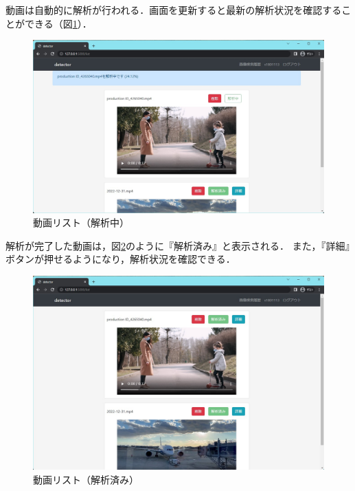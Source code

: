 \documentclass[a4j,12pt,dvipdfmx]{jreport}
\begin{document}
動画は自動的に解析が行われる．画面を更新すると最新の解析状況を確認することができる（図\ref{fig:ongoing}）．
\begin{figure}[H]
  \centering
  \includegraphics[width=13cm]{image/ongoing.jpg}
  \caption{動画リスト（解析中）}
  \label{fig:ongoing}
\end{figure}

解析が完了した動画は，図\ref{fig:complete}のように『解析済み』と表示される．
また，『詳細』ボタンが押せるようになり，解析状況を確認できる．
\begin{figure}[H]
  \centering
  \includegraphics[width=13cm]{image/complete.jpg}
  \caption{動画リスト（解析済み）}
  \label{fig:complete}
\end{figure}
\end{document}
